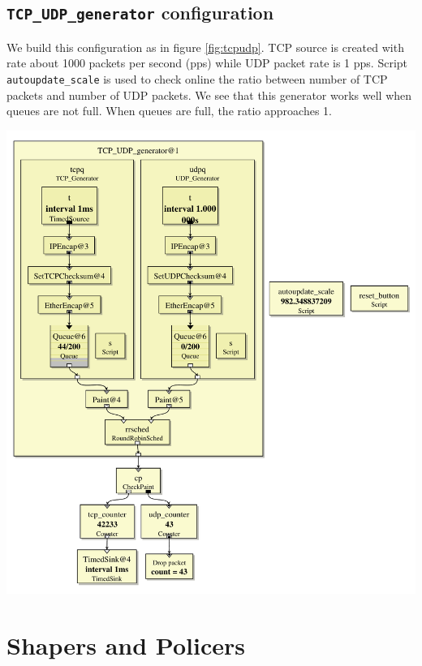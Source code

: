 \documentclass[a4paper]{article}
\begin{document}
  \subsection{\texttt{TCP\_UDP\_generator} configuration}
  We build this configuration as in figure \ref{fig:tcpudp}. TCP source is created with rate about 1000 packets per second (pps) while UDP packet rate is 1 pps. Script \texttt{autoupdate\_scale} is used to check online the ratio between number of TCP packets and number of UDP packets. We see that this generator works well when queues are not full. When queues are full, the ratio approaches 1.
    \begin{center}
	  \includegraphics[scale=0.4]{TCP_UDP_generator.pdf}
	  \label{fig:tcpudp}
  \end{center}
  \section{Shapers and Policers}
\end{document}
